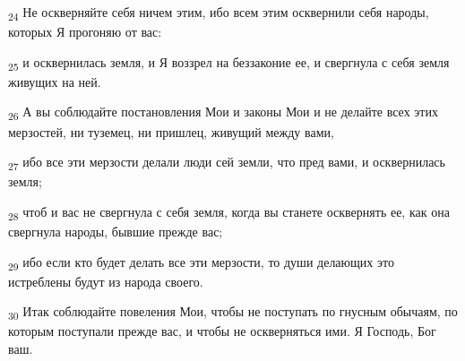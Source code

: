 \begin{tcolorbox}
\textsubscript{24} Не оскверняйте себя ничем этим, ибо всем этим осквернили себя народы, которых Я прогоняю от вас:
\end{tcolorbox}
\begin{tcolorbox}
\textsubscript{25} и осквернилась земля, и Я воззрел на беззаконие ее, и свергнула с себя земля живущих на ней.
\end{tcolorbox}
\begin{tcolorbox}
\textsubscript{26} А вы соблюдайте постановления Мои и законы Мои и не делайте всех этих мерзостей, ни туземец, ни пришлец, живущий между вами,
\end{tcolorbox}
\begin{tcolorbox}
\textsubscript{27} ибо все эти мерзости делали люди сей земли, что пред вами, и осквернилась земля;
\end{tcolorbox}
\begin{tcolorbox}
\textsubscript{28} чтоб и вас не свергнула с себя земля, когда вы станете осквернять ее, как она свергнула народы, бывшие прежде вас;
\end{tcolorbox}
\begin{tcolorbox}
\textsubscript{29} ибо если кто будет делать все эти мерзости, то души делающих это истреблены будут из народа своего.
\end{tcolorbox}
\begin{tcolorbox}
\textsubscript{30} Итак соблюдайте повеления Мои, чтобы не поступать по гнусным обычаям, по которым поступали прежде вас, и чтобы не оскверняться ими. Я Господь, Бог ваш.
\end{tcolorbox}
